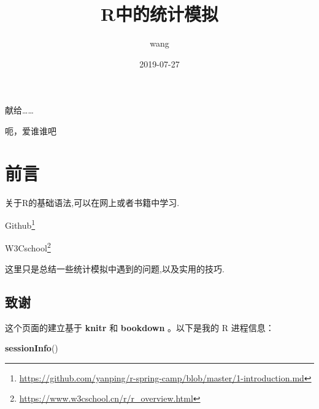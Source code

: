 \documentclass[]{ctexbook}
\title{R中的统计模拟}
\author{wang}
\date{2019-07-27}
\newenvironment{Shaded}{\begin{snugshade}}{\end{snugshade}}
\newcommand{\KeywordTok}[1]{\textcolor[rgb]{0.13,0.29,0.53}{\textbf{#1}}}
\newcommand{\NormalTok}[1]{#1}
\renewcommand{\href}[2]{#2\footnote{\url{#1}}}
\begin{document}
\maketitle


\thispagestyle{empty}

\begin{center}
献给……

呃，爱谁谁吧
\end{center}

\setlength{\abovedisplayskip}{-5pt}
\setlength{\abovedisplayshortskip}{-5pt}

{
\setcounter{tocdepth}{2}
\tableofcontents
}
\listoftables
\listoffigures
\hypertarget{section}{%
\chapter*{前言}\label{section}}


关于R的基础语法,可以在网上或者书籍中学习.

\href{https://github.com/yanping/r-spring-camp/blob/master/1-introduction.md}{Github}

\href{https://www.w3cschool.cn/r/r_overview.html}{W3Cschool}

这里只是总结一些统计模拟中遇到的问题,以及实用的技巧.

\hypertarget{section-1}{%
\section*{致谢}\label{section-1}}


这个页面的建立基于 \textbf{knitr} \citep{xie2015}和 \textbf{bookdown} \citep{R-bookdown}。以下是我的 R 进程信息：

\begin{Shaded}
\begin{Highlighting}[]
\KeywordTok{sessionInfo}\NormalTok{()}
\end{Highlighting}
\end{Shaded}
\end{document}

